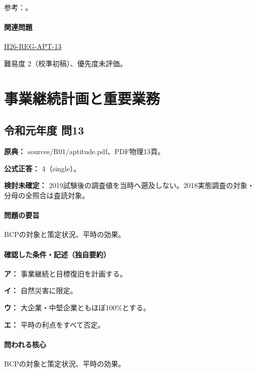 \par 参考：\cite{eng52_infra2014}。

\paragraph{関連問題} \hyperref[q:h26-reg-apt-13]{H26-REG-APT-13}

\par 難易度 2（校準初稿）、優先度未評価。

\section{事業継続計画と重要業務}

\subsection{令和元年度 問13}
\label{q:r01-reg-apt-13}

\noindent\textbf{原典：} sources/R01/aptitude.pdf、PDF物理13頁。

\textbf{公式正答：} 4（single）。

\par\textbf{検討未確定：} 2019試験後の調査値を当時へ遡及しない。2018実態調査の対象・分母の全照合は査読対象。

\paragraph{問題の要旨} BCPの対象と策定状況、平時の効果。

\paragraph{確認した条件・記述（独自要約）}\mbox{}\par

\noindent\textbf{ア：} 事業継続と目標復旧を計画する。\par

\noindent\textbf{イ：} 自然災害に限定。\par

\noindent\textbf{ウ：} 大企業・中堅企業ともほぼ100\%とする。\par

\noindent\textbf{エ：} 平時の利点をすべて否定。\par

\paragraph{問われる核心} BCPの対象と策定状況、平時の効果。

